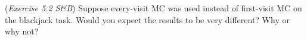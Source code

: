 (\textit{Exercise 5.2 S\&B}) Suppose every-visit MC was used instead of 
first-visit MC on the blackjack task. Would you expect the results to be very
different? Why or why not?

